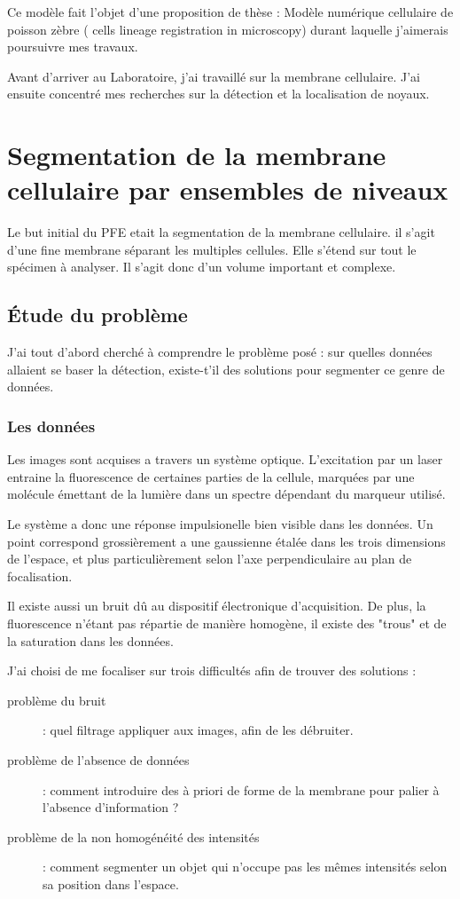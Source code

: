 Ce modèle fait l'objet d'une proposition de thèse : Modèle numérique cellulaire de poisson zèbre ( cells lineage registration in microscopy) durant laquelle j'aimerais poursuivre mes travaux.

Avant d'arriver au Laboratoire, j'ai travaillé sur la membrane cellulaire. J'ai ensuite concentré mes recherches sur la détection et la localisation de noyaux.

\section{Segmentation de la membrane cellulaire par ensembles de niveaux}

Le but initial du PFE etait la segmentation de la membrane cellulaire. il s'agit d'une fine membrane séparant les multiples cellules. Elle s'étend sur tout le spécimen à analyser. Il s'agit donc d'un volume important et complexe.

\subsection{Étude du problème}

J'ai tout d'abord cherché à comprendre le problème posé : sur quelles données allaient se baser la détection, existe-t'il des solutions pour segmenter ce genre de données.

\subsubsection{Les données}
Les images sont acquises a travers un système optique. L'excitation par un laser entraine la fluorescence de certaines parties de la cellule, marquées par une molécule émettant de la lumière dans un spectre dépendant du marqueur utilisé.

Le système a donc une réponse impulsionelle bien visible dans les données. Un point correspond grossièrement a une gaussienne étalée dans les trois dimensions de l'espace, et plus particulièrement selon l'axe perpendiculaire au plan de focalisation.

Il existe aussi un bruit dû au dispositif électronique d'acquisition. De plus, la fluorescence n'étant pas répartie de manière homogène, il existe des "trous" et de la saturation dans les données.


J'ai choisi de me focaliser sur trois difficultés afin de trouver des solutions :
\begin{description}
  \item [problème du bruit] : quel filtrage appliquer aux images, afin de les débruiter.
  \item [problème de l'absence de données] : comment introduire des à priori de forme de la membrane
  pour palier à l'absence d'information ?
  \item [problème de la non homogénéité des intensités]  : comment segmenter un objet
  qui n'occupe pas les mêmes intensités selon sa position dans l'espace.
\end{description}


